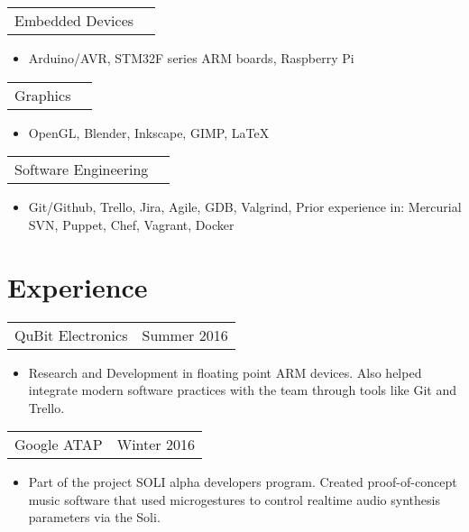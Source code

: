 \documentclass[margin]{res}
\begin{document}
\begin{resume}
\begin{tabular}{p{3in} r} %
Embedded Devices
\end{tabular}	
\begin{itemize} %
\item[] Arduino/AVR, STM32F series ARM boards, Raspberry Pi
\end{itemize} 

\begin{tabular}{p{3in} r} %
Graphics
\end{tabular}	
\begin{itemize} %
\item[] OpenGL, Blender, Inkscape, GIMP, LaTeX
\end{itemize} 

\begin{tabular}{p{3in} r} %
Software Engineering
\end{tabular}	
\begin{itemize} %
\item[] Git/Github, Trello, Jira, Agile, GDB, Valgrind, 
    Prior experience in: Mercurial SVN, Puppet, Chef, Vagrant, Docker
\end{itemize} 


\section{Experience}      

\begin{tabular}{p{3in} r} 
QuBit Electronics &  Summer 2016
\end{tabular}	
\begin{itemize} %
\item[] Research and Development in floating point ARM devices. Also helped 
integrate modern software practices with the team through tools like Git and
Trello.
\end{itemize} 

\begin{tabular}{p{3in} r} %
Google ATAP & Winter 2016
\end{tabular}	
\begin{itemize} %
\item[] Part of the project SOLI alpha developers program. Created proof-of-concept
music software that used microgestures to control realtime audio synthesis 
parameters via the Soli. 
\end{itemize} 


\end{resume}
\end{document}

